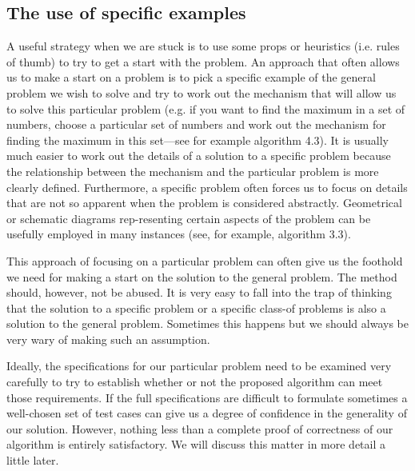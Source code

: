 \documentclass{book}
\begin{document}
\subsection{The use of specific examples}
A useful strategy when we are stuck is to use some props or heuristics (i.e. rules of thumb) to try to get a start with the problem. An approach that often allows us to make a start on a problem is to pick a specific example of the general problem we wish to solve and try to work out the mechanism that will allow us to solve this particular problem (e.g. if you want to find the maximum in a set of numbers, choose a particular set of numbers and work out the mechanism for finding the maximum in this set—see for example algorithm 4.3). It is usually much easier to work out the details of a solution to a specific problem because the relationship between the mechanism and the particular problem is more clearly defined. Furthermore, a specific problem often forces us to focus on details that are not so apparent when the problem is considered abstractly. Geometrical or schematic diagrams rep-resenting certain aspects of the problem can be usefully employed in many instances (see, for example, algorithm 3.3).\par
	This approach of focusing on a particular problem can often give us the foothold we need for making a start on the solution to the general problem. The method should, however, not be abused. It is very easy to fall into the trap of thinking that the solution to a specific problem or a specific class-of problems is also a solution to the general problem. Sometimes this happens but we should always be very wary of making such an assumption.\par
	Ideally, the specifications for our particular problem need to be examined very carefully to try to establish whether or not the proposed algorithm can meet those requirements. If the full specifications are difficult to formulate sometimes a well-chosen set of test cases can give us a degree of confidence in the generality of our solution. However, nothing less than a complete proof of correctness of our algorithm is entirely satisfactory. We will discuss this matter in more detail a little later.
\end{document}
